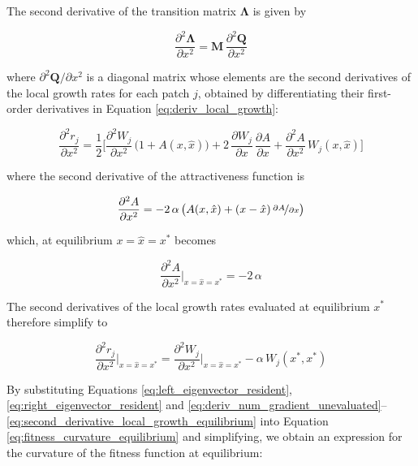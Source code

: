 The second derivative of the transition matrix $\pmb \Lambda$ is given by 

\begin{equation}
    \frac{\partial^2 \pmb{\Lambda}}{\partial x^2} = \pmb{M} \, \frac{\partial^2 \pmb{Q}}{\partial x^2}
    \label{eq:second_derivative_transition}
\end{equation}

where $\partial^2 \pmb{Q} / \partial x^2$ is a diagonal matrix whose elements are the second derivatives of the local growth rates for each patch $j$, obtained by differentiating their first-order derivatives in Equation \ref{eq:deriv_local_growth}:

\begin{equation}
    \frac{\partial^2 r_j}{\partial x^2} = \frac{1}{2} \bigg[\frac{\partial^2 W_j}{\partial x^2}\,\big(1+A(x,\hat{x})\big) + 2\,\frac{\partial W_j}{\partial x}\,\frac{\partial A}{\partial x} + \frac{\partial^2 A}{\partial x^2}\,W_j(x,\hat{x})\bigg]
\end{equation}

where the second derivative of the attractiveness function is

\begin{equation}
    \frac{\partial^2 A}{\partial x^2} = -2\,\alpha\,\big( A(x,\hat{x}) + (x-\hat{x})\,\nicefrac{\partial A}{\partial x} \big)
\end{equation}

which, at equilibrium $x=\hat{x}=x^*$ becomes

\begin{equation}
    \frac{\partial^2 A}{\partial x^2}\bigg|_{x=\hat{x}=x^*} = -2\,\alpha
\end{equation}

The second derivatives of the local growth rates evaluated at equilibrium $x^*$ therefore simplify to

\begin{equation}
    \frac{\partial^2 r_j}{\partial x^2}\bigg|_{x=\hat{x}=x^*}= \frac{\partial^2 W_j}{\partial x^2}\bigg|_{x=\hat{x}=x^*} - \alpha \, W_j(x^*,x^*)
    \label{eq:second_derivative_local_growth_equilibrium}
\end{equation}

By substituting Equations \ref{eq:left_eigenvector_resident}, \ref{eq:right_eigenvector_resident} and \ref{eq:deriv_num_gradient_unevaluated}--\ref{eq:second_derivative_local_growth_equilibrium} into Equation \ref{eq:fitness_curvature_equilibrium} and simplifying, we obtain an expression for the curvature of the fitness function at equilibrium:


